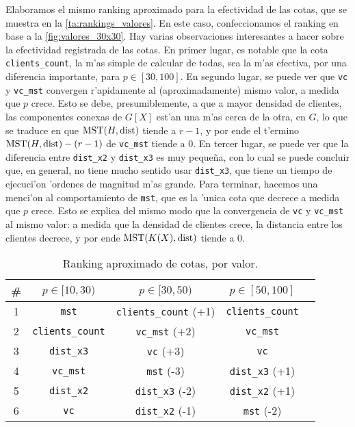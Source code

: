 Elaboramos el mismo ranking aproximado para la efectividad de las cotas, que se muestra en la \autoref{ta:rankings_valores}. En este caso, confeccionamos el ranking en base a la \autoref{fig:valores_30x30}. Hay varias observaciones interesantes a hacer sobre la efectividad registrada de las cotas. En primer lugar, es notable que la cota \texttt{clients\_count}, la m'as simple de calcular de todas, sea la m'as efectiva, por una diferencia importante, para $p \in [30, 100]$. En segundo lugar, se puede ver que \texttt{vc} y \texttt{vc\_mst} convergen r'apidamente al (aproximadamente) mismo valor, a medida que $p$ crece. Esto se debe, presumiblemente, a que a mayor densidad de clientes, las componentes conexas de $G[X]$ est'an una m'as cerca de la otra, en $G$, lo que se traduce en que $\textnormal{MST}(H, \textnormal{dist})$ tiende a $r - 1$, y por ende el t'ermino $\textnormal{MST}(H, \textnormal{dist}) - (r - 1)$ de \texttt{vc\_mst} tiende a $0$. En tercer lugar, se puede ver que la diferencia entre \texttt{dist\_x2} y \texttt{dist\_x3} es muy peque\~na, con lo cual se puede concluir que, en general, no tiene mucho sentido usar \texttt{dist\_x3}, que tiene un tiempo de ejecuci'on 'ordenes de magnitud m'as grande. Para terminar, hacemos una menci'on al comportamiento de \texttt{mst}, que es la 'unica cota que decrece a medida que $p$ crece. Esto se explica del mismo modo que la convergencia de \texttt{vc} y \texttt{vc\_mst} al mismo valor: a medida que la densidad de clientes crece, la distancia entre los clientes decrece, y por ende $\textnormal{MST}(K(X), \textnormal{dist})$ tiende a $0$.

\begin{table}[h]
\begin{center}
\begin{tabular}{|c|c|c|c|c|}
\hline
\# & $p \in [10, 30)$ & $p \in [30, 50)$ & $p \in [50, 100]$\\
\hline
1 & \texttt{mst} & \texttt{clients\_count} (+1) & \texttt{clients\_count}\\
2 & \texttt{clients\_count} & \texttt{vc\_mst} (+2) & \texttt{vc\_mst}\\
3 & \texttt{dist\_x3} & \texttt{vc} (+3) & \texttt{vc}\\
4 & \texttt{vc\_mst} & \texttt{mst} (-3) & \texttt{dist\_x3} (+1)\\
5 & \texttt{dist\_x2} & \texttt{dist\_x3} (-2) & \texttt{dist\_x2} (+1)\\
6 & \texttt{vc} & \texttt{dist\_x2} (-1) & \texttt{mst} (-2)\\
\hline
\end{tabular}
\end{center}
\caption{Ranking aproximado de cotas, por valor.}
\label{ta:rankings_valores}
\end{table}

